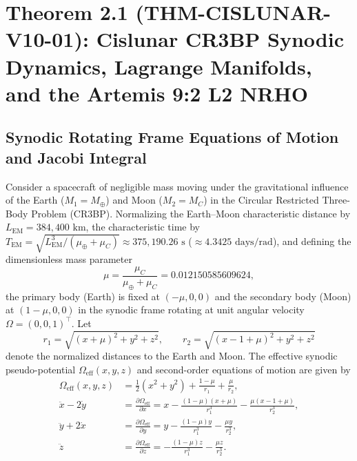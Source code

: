 \documentclass[11pt,a4paper,reqno]{article}
\def\bm#1{#1}%
\def\texttt#1{#1}%
\def\mathbb#1{#1}%
\theoremstyle{plain}
\theoremstyle{definition}
\theoremstyle{remark}
\numberwithin{equation}{section}
\begin{document}
\section{\texorpdfstring{Theorem 2.1 (\texttt{THM-CISLUNAR-V10-01}): Cislunar CR3BP Synodic Dynamics, Lagrange Manifolds, and the Artemis 9:2 L2 NRHO}{Theorem 2.1 (THM-CISLUNAR-V10-01): Cislunar CR3BP Synodic Dynamics, Lagrange Manifolds, and the Artemis 9:2 L2 NRHO}}

\subsection{Synodic Rotating Frame Equations of Motion and Jacobi Integral}
Consider a spacecraft of negligible mass moving under the gravitational influence of the Earth ($M_1 = M_\oplus$) and Moon ($M_2 = M_{\mathbb{C}}$) in the Circular Restricted Three-Body Problem (CR3BP). Normalizing the Earth--Moon characteristic distance by $L_{\text{EM}} = 384,400\text{ km}$, the characteristic time by $T_{\text{EM}} = \sqrt{L_{\text{EM}}^3 / (\mu_\oplus + \mu_{\mathbb{C}})} \approx 375,190.26\text{ s}$ ($\approx 4.3425\text{ days/rad}$), and defining the dimensionless mass parameter
\begin{equation}
  \mu = \frac{\mu_{\mathbb{C}}}{\mu_\oplus + \mu_{\mathbb{C}}} = 0.012150585609624,
  \label{eq:cr3bp_mu}
\end{equation}
the primary body (Earth) is fixed at $(-\mu, 0, 0)$ and the secondary body (Moon) at $(1 - \mu, 0, 0)$ in the synodic frame rotating at unit angular velocity $\bm{\Omega} = (0, 0, 1)^\top$. Let
\begin{equation}
  r_1 = \sqrt{(x + \mu)^2 + y^2 + z^2}, \qquad r_2 = \sqrt{(x - 1 + \mu)^2 + y^2 + z^2}
  \label{eq:r1_r2_def}
\end{equation}
denote the normalized distances to the Earth and Moon. The effective synodic pseudo-potential $\Omega_{\text{eff}}(x, y, z)$ and second-order equations of motion are given by
\begin{align}
  \Omega_{\text{eff}}(x, y, z) &= \frac{1}{2}(x^2 + y^2) + \frac{1 - \mu}{r_1} + \frac{\mu}{r_2}, \label{eq:pseudo_potential} \\
  \ddot{x} - 2\dot{y} &= \frac{\partial \Omega_{\text{eff}}}{\partial x} = x - \frac{(1 - \mu)(x + \mu)}{r_1^3} - \frac{\mu(x - 1 + \mu)}{r_2^3}, \label{eq:cr3bp_x} \\
  \ddot{y} + 2\dot{x} &= \frac{\partial \Omega_{\text{eff}}}{\partial y} = y - \frac{(1 - \mu)y}{r_1^3} - \frac{\mu y}{r_2^3}, \label{eq:cr3bp_y} \\
  \ddot{z} &= \frac{\partial \Omega_{\text{eff}}}{\partial z} = -\frac{(1 - \mu)z}{r_1^3} - \frac{\mu z}{r_2^3}. \label{eq:cr3bp_z}
\end{align}
\end{document}
